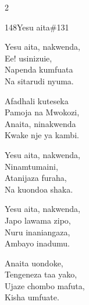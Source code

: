 \begin{multicols}{2}
\begin{hymn}{148}{Yesu aita}{\#131}
\begin{stanza}
Yesu aita, nakwenda,\\
Ee! usinizuie,\\
Napenda kumfuata\\
Na sitarudi nyuma.
\end{stanza}
\begin{chorus}
Afadhali kuteseka\\
Pamoja na Mwokozi,\\
Anaita, ninakwenda\\
Kwake nje ya kambi.
\end{chorus}
\begin{stanza}
Yesu aita, nakwenda,\\
Ninamtumaini,\\
Atanijaza furaha,\\
Na kuondoa shaka.
\end{stanza}
\begin{stanza}
Yesu aita, nakwenda,\\
Japo lawama zipo,\\
Nuru inaniangaza,\\
Ambayo inadumu.
\end{stanza}
\begin{stanza}
Anaita uondoke,\\
Tengeneza taa yako,\\
Ujaze chombo mafuta,\\
Kisha umfuate.
\end{stanza}
\end{hymn}


\end{multicols}
